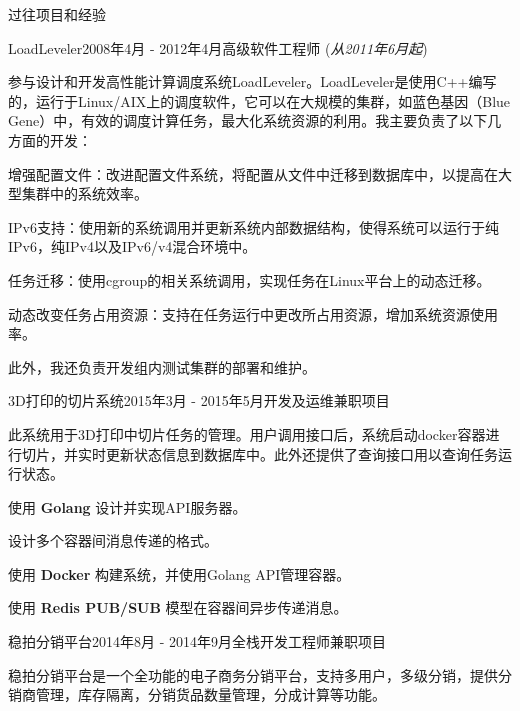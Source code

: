 \documentclass{resume} %
\newcommand{\kaiti}{\CJKfamily{kaiti}}
\begin{document}
\begin{rSection}{\kaiti 过往项目和经验}
\begin{rSubsection}{LoadLeveler}{2008年4月 - 2012年4月}{高级软件工程师 (\textit{从2011年6月起})}{}

参与设计和开发高性能计算调度系统LoadLeveler。LoadLeveler是使用C++编写的，运行于Linux/AIX上的调度软件，它可以在大规模的集群，如蓝色基因（Blue Gene）中，有效的调度计算任务，最大化系统资源的利用。我主要负责了以下几方面的开发：

\begin{rSubsectionList}
\item 增强配置文件：改进配置文件系统，将配置从文件中迁移到数据库中，以提高在大型集群中的系统效率。
\item IPv6支持：使用新的系统调用并更新系统内部数据结构，使得系统可以运行于纯IPv6，纯IPv4以及IPv6/v4混合环境中。
\item 任务迁移：使用cgroup的相关系统调用，实现任务在Linux平台上的动态迁移。
\item 动态改变任务占用资源：支持在任务运行中更改所占用资源，增加系统资源使用率。
\end{rSubsectionList}\vspace{-1.5em}

此外，我还负责开发组内测试集群的部署和维护。
\end{rSubsection}
\vspace{1.8em}


\begin{rSubsection}{3D打印的切片系统}{2015年3月 - 2015年5月}{开发及运维}{兼职项目}

此系统用于3D打印中切片任务的管理。用户调用接口后，系统启动docker容器进行切片，并实时更新状态信息到数据库中。此外还提供了查询接口用以查询任务运行状态。

\begin{rSubsectionList}
\item 使用 \textbf{Golang} 设计并实现API服务器。
\item 设计多个容器间消息传递的格式。
\item 使用 \textbf{Docker} 构建系统，并使用Golang API管理容器。
\item 使用 \textbf{Redis PUB/SUB} 模型在容器间异步传递消息。
\end{rSubsectionList}
\end{rSubsection}



\begin{rSubsection}{稳拍分销平台}{2014年8月 - 2014年9月}{全栈开发工程师}{兼职项目}

稳拍分销平台是一个全功能的电子商务分销平台，支持多用户，多级分销，提供分销商管理，库存隔离，分销货品数量管理，分成计算等功能。


\end{rSubsection}
\end{rSection}
\end{document}
